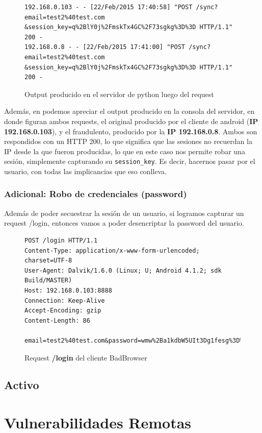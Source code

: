 \documentclass[11pt, a4paper, twoside]{article}
\begin{document}
\begin{figure}[H]
\begin{Verbatim}[frame=single,fontsize=\small]
192.168.0.103 - - [22/Feb/2015 17:40:58] "POST /sync?email=test2%40test.com
&session_key=q%2BlY0j%2FmskTx4GC%2F73sgkg%3D%3D HTTP/1.1" 200 -
192.168.0.8 - - [22/Feb/2015 17:41:00] "POST /sync?email=test2%40test.com
&session_key=q%2BlY0j%2FmskTx4GC%2F73sgkg%3D%3D HTTP/1.1" 200 -
\end{Verbatim}
\caption{Output producido en el servidor de python luego del request}
\label{fig:sync-simulado3}
\end{figure}

Además, en  podemos apreciar el output producido en la consola del servidor, en donde figuran ambos requests, el original producido por el cliente de android (\textbf{IP 192.168.0.103}), y el fraudulento, producido por la \textbf{IP 192.168.0.8}. Ambos son respondidos con un HTTP 200, lo que significa que las sesiones no recuerdan la IP desde la que fueron producidas, lo que en este caso nos permite robar una sesión, simplemente capturando su \texttt{session\_key}. Es decir, hacernos pasar por el usuario, con todas las implicancias que eso conlleva.

\subsubsection{Adicional: Robo de credenciales (password)}
Además de poder secuestrar la sesión de un usuario, si logramos capturar un request /login, entonces vamos a poder desencriptar la password del usuario.

\begin{figure}[H]
\begin{Verbatim}[frame=single,fontsize=\small]
POST /login HTTP/1.1
Content-Type: application/x-www-form-urlencoded; charset=UTF-8
User-Agent: Dalvik/1.6.0 (Linux; U; Android 4.1.2; sdk Build/MASTER)
Host: 192.168.0.103:8888
Connection: Keep-Alive
Accept-Encoding: gzip
Content-Length: 86

email=test2%40test.com&password=wmw%2Ba1kdbW5UIt3Dg1fesg%3D%3D%0A&uuid=000000000000000
\end{Verbatim}
\caption{Request \textbf{\color{red}/login} del cliente BadBrowser}
\label{fig:sniffer-login}
\end{figure}

%
%
\clearpage
\subsection{Activo}

%
%
\clearpage
{}
\section{Vulnerabilidades Remotas}

\end{document}
